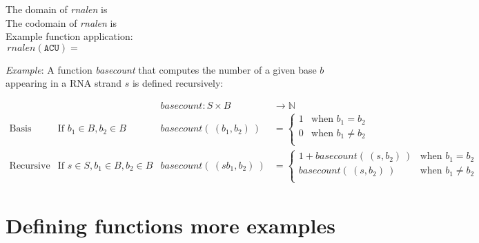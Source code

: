\documentclass[12pt, oneside]{article}
\newcommand{\A}[0]{\texttt{A}}
\newcommand{\C}[0]{\texttt{C}}
\newcommand{\G}[0]{\texttt{G}}
\newcommand{\U}[0]{\texttt{U}}
\begin{document}
The domain of \textit{rnalen} is \phantom{$S$}\\

The codomain of \textit{rnalen} is \\

Example function application:
\[
rnalen(\A\C\U) = \phantom{1+ rnalen(\A\C) = 1 + (1 + rnalen(\A) ) = 1 + ( 1 + 1) = 3}
\]

\vfill

{\it Example}: A function \textit{basecount} that computes the number of a given base 
$b$ appearing in a RNA strand $s$ is defined recursively:
    
\[
\begin{array}{llll}
& & \textit{basecount} : S \times B & \to \mathbb{N} \\
\textrm{Basis Step:} &  \textrm{If } b_1 \in B, b_2 \in B & \textit{basecount}(~(b_1, b_2)~) & =
        \begin{cases}
            1 & \textrm{when } b_1 = b_2 \\
            0 & \textrm{when } b_1 \neq b_2 \\
        \end{cases} \\
\textrm{Recursive Step:} & \textrm{If } s \in S, b_1 \in B, b_2 \in B &\textit{basecount}(~(s b_1, b_2)~) & =
        \begin{cases}
            1 + \textit{basecount}(~(s, b_2)~) & \textrm{when } b_1 = b_2 \\
            \textit{basecount}(~(s, b_2)~) & \textrm{when } b_1 \neq b_2 \\
        \end{cases}
\end{array}
\]

 \vfill
\section*{Defining functions more examples}
\end{document}
